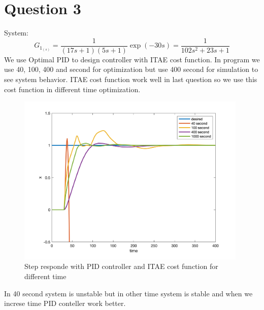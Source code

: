 \section{Question 3}
System:
$$
G_{1_{(s)}} = \dfrac{1}{(17s+1)(5s+1)}\exp(-30s) = \dfrac{1}{102s^2+23s+1}
$$
We use Optimal PID to design controller with ITAE cost function. In program we use 40, 100, 400 and second for optimization but use 400 second for simulation to see system behavior. ITAE cost function work well in last question so we use this cost function in different time optimization.
\begin{figure}[H]
    \caption{Step responde with PID controller and ITAE cost function for different time}
    \centering
    \includegraphics[width=11cm]{../Figure/Q3/ITAE.png}
\end{figure}
In 40 second system is unstable but in other time system is stable and when we increse time PID conteller work better.